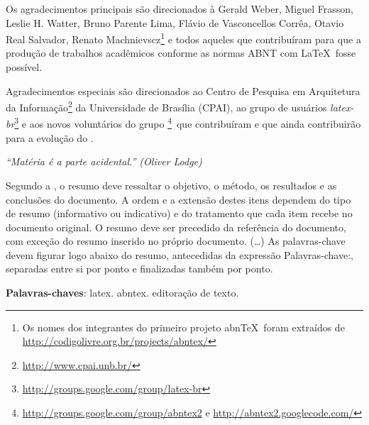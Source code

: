 \documentclass[
	12pt,				%
	openright,			%
	twoside,			%
	a4paper,			%
	english,			%
	brazil				%
	]{abntex2ufop} %
\begin{document}
\begin{agradecimentos}
\noindent Os agradecimentos principais são direcionados à Gerald Weber, Miguel Frasson,
Leslie H. Watter, Bruno Parente Lima, Flávio de Vasconcellos Corrêa, Otavio Real
Salvador, Renato Machnievscz\footnote{Os nomes dos integrantes do primeiro
projeto abn\TeX\ foram extraídos de
\url{http://codigolivre.org.br/projects/abntex/}} e todos aqueles que
contribuíram para que a produção de trabalhos acadêmicos conforme
as normas ABNT com \LaTeX\ fosse possível.

\noindent Agradecimentos especiais são direcionados ao Centro de Pesquisa em Arquitetura
da Informação\footnote{\url{http://www.cpai.unb.br/}} da Universidade de
Brasília (CPAI), ao grupo de usuários
\emph{latex-br}\footnote{\url{http://groups.google.com/group/latex-br}} e aos
novos voluntários do grupo
\emph{\abnTeX}\footnote{\url{http://groups.google.com/group/abntex2} e
\url{http://abntex2.googlecode.com/}}~que contribuíram e que ainda
contribuirão para a evolução do \abnTeX.

\end{agradecimentos}

\begin{epigrafe}
    \vspace*{\fill}
	\begin{flushright}
		\textit{``Matéria é a parte acidental.'' (Oliver Lodge)}
	\end{flushright}
\end{epigrafe}


\setlength{\absparsep}{18pt} %
\begin{resumo}
 \noindent Segundo a , o resumo deve ressaltar o objetivo, o método, os resultados e as conclusões do documento. A ordem e a extensão
 destes itens dependem do tipo de resumo (informativo ou indicativo) e do tratamento que cada item recebe no documento original. O resumo deve ser precedido da referência do documento, com exceção do resumo inserido no
 próprio documento. (\ldots) As palavras-chave devem figurar logo abaixo do resumo, antecedidas da expressão Palavras-chave:, separadas entre si por
 ponto e finalizadas também por ponto.

 \textbf{Palavras-chaves}: latex. abntex. editoração de texto.
\end{resumo}
\end{document}
